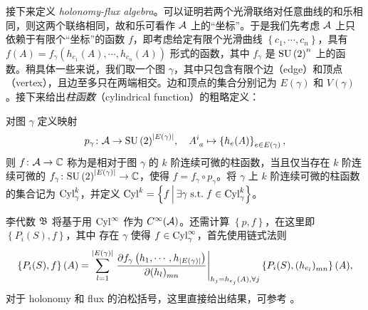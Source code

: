 
		接下来定义 \emph{holonomy-flux algebra}。可以证明若两个光滑联络对任意曲线的和乐相同，则这两个联络相同，故和乐可看作 $\mathcal{A}$ 上的“坐标”。于是我们先考虑 $\mathcal{A}$ 上只依赖于有限个“坐标”的函数 $f$，即考虑给定有限个光滑曲线 $\left\{ c_1, \cdots, c_n \right\}$，具有 $f(A) = f_\gamma(h_{c_1}(A),\cdots,h_{c_n}(A))$ 形式的函数，其中 $f_\gamma$ 是 $\mathrm{SU}\left(2\right)^n$ 上的函数。稍具体一些来说，我们取一个图 $\gamma$，其中只包含有限个边（edge）和顶点（vertex），且边至多只在两端相交。边和顶点的集合分别记为 $E(\gamma)$ 和 $V(\gamma)$。接下来给出\emph{柱函数}（cylindrical function）的粗略定义：
		\begin{Definition}
			对图 $\gamma$ 定义映射
			\begin{equation}
				p_\gamma \colon \configurationspace{A} \rightarrow {\SU{2}}^{\card{E(\gamma)}} \qc
				\tensor{A}{^i_a} \mapsto \left\{ h_e(A) \right\}_{e \in E(\gamma)},\label{eq-p_gamma}
			\end{equation}
			则 $f\colon \mathcal{A} \rightarrow \mathbb{C}$ 称为是相对于图 $\gamma$ 的 $k$ 阶连续可微的柱函数，当且仅当存在 $k$ 阶连续可微的 $f_\gamma \colon {\ensuremath{\mathrm{SU}\left(2\right)}}^{\abs{E(\gamma)}} \rightarrow \mathbb{C}$，使得 $f=f_\gamma \circ p_\gamma$。将 $\gamma$ 上 $k$ 阶连续可微的柱函数的集合记为 $\mathrm{Cyl}_\gamma^k$，并定义 $\mathrm{Cyl}^k = \left\{ f \,\middle\vert\, \exists \gamma \;\text{s.t.}\; f\in \mathrm{Cyl}_\gamma^k \right\}$。
		\end{Definition}
		李代数 $\mathfrak{B}$ 将基于用 $\mathrm{Cyl}^\infty$ 作为 $C^\infty(\mathcal{A})$。还需计算 $\left\{ p, f \right\}$，在这里即 $\left\{ P_i(S), f \right\}$，其中 存在 $\gamma$ 使得 $f\in \mathrm{Cyl}_\gamma^\infty$，首先使用链式法则
		\begin{equation}
			\left\{ P_i(S), f \right\}(A) = \sum_{l=1}^{\card{E(\gamma)}} \eval{\pdv{f_\gamma\left( h_1, \cdots , h_{\card{E(\gamma)}} \right)}{\tensor{(h_l)}{_m_n}}}_{h_j=h_{e_j}(A),\forall j} \left\{ P_i(S), \tensor{(h_{e_l})}{_m_n} \right\}(A),
		\end{equation}
		对于 holonomy 和 flux 的泊松括号，这里直接给出结果，可参考 \cite{Thiemann2007,Thiemann0210094}。

